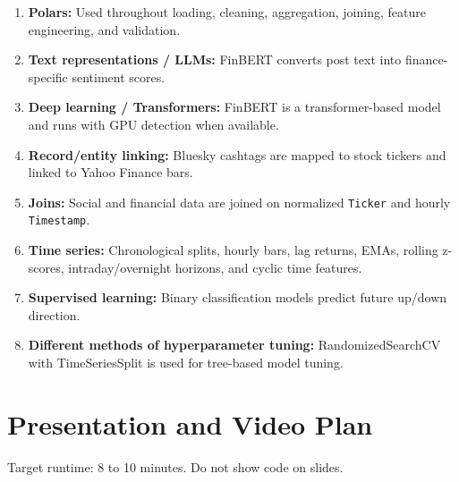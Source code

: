 \documentclass[11pt]{article}
\begin{document}
\begin{enumerate}
    \item \textbf{Polars:} Used throughout loading, cleaning, aggregation, joining, feature engineering, and validation.
    \item \textbf{Text representations / LLMs:} FinBERT converts post text into finance-specific sentiment scores.
    \item \textbf{Deep learning / Transformers:} FinBERT is a transformer-based model and runs with GPU detection when available.
    \item \textbf{Record/entity linking:} Bluesky cashtags are mapped to stock tickers and linked to Yahoo Finance bars.
    \item \textbf{Joins:} Social and financial data are joined on normalized \texttt{Ticker} and hourly \texttt{Timestamp}.
    \item \textbf{Time series:} Chronological splits, hourly bars, lag returns, EMAs, rolling z-scores, intraday/overnight horizons, and cyclic time features.
    \item \textbf{Supervised learning:} Binary classification models predict future up/down direction.
    \item \textbf{Different methods of hyperparameter tuning:} RandomizedSearchCV with TimeSeriesSplit is used for tree-based model tuning.
\end{enumerate}

\section{Presentation and Video Plan}

Target runtime: 8 to 10 minutes. Do not show code on slides.
\end{document}
